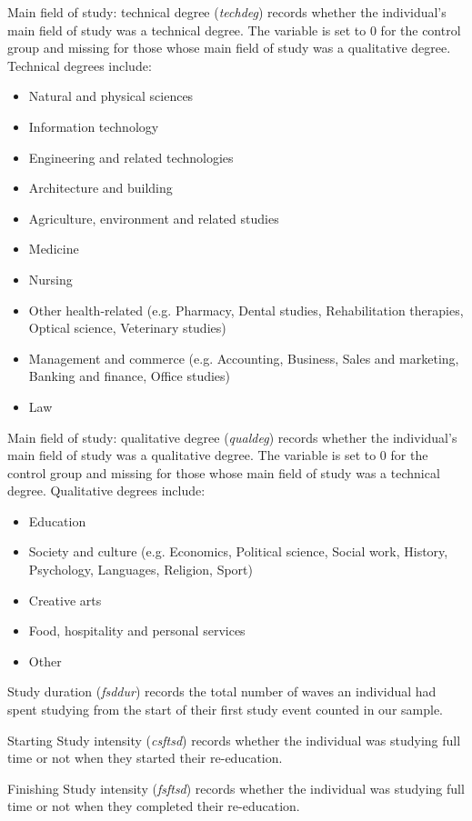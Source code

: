 \documentclass[12pt, a4paper]{article}
\begin{document}
Main field of study: technical degree (\textit{techdeg}) records whether the individual’s main field of study was a technical degree. The variable is set to 0 for the control group and missing for those whose main field of study was a qualitative degree. Technical degrees include:
\begin{itemize}
  \item Natural and physical sciences
  \item Information technology
  \item Engineering and related technologies
  \item Architecture and building
  \item Agriculture, environment and related studies
  \item Medicine
  \item Nursing
  \item Other health-related (e.g. Pharmacy, Dental studies, Rehabilitation therapies, Optical science, Veterinary studies) 
  \item Management and commerce (e.g. Accounting, Business, Sales and marketing, Banking and finance, Office studies) 
  \item Law
\end{itemize}  

Main field of study: qualitative degree (\textit{qualdeg}) records whether the individual’s main field of study was a qualitative degree. The variable is set to 0 for the control group and missing for those whose main field of study was a technical degree. Qualitative degrees include:
\begin{itemize} 
  \item Education
  \item Society and culture (e.g. Economics, Political science, Social work, History, Psychology, Languages, Religion, Sport)
  \item Creative arts
  \item Food, hospitality and personal services
  \item Other
\end{itemize}  

Study duration (\textit{fsddur}) records the total number of waves an individual had spent studying from the start of their first study event counted in our sample. 

Starting Study intensity (\textit{csftsd}) records whether the individual was studying full time or not when they started their re-education. 

Finishing Study intensity (\textit{fsftsd}) records whether the individual was studying full time or not when they completed their re-education. 
\end{document}
